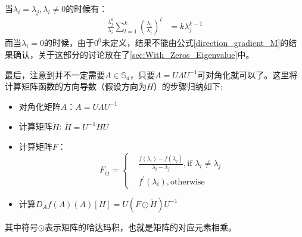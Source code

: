 当$\lambda_{i}=\lambda_{j},\lambda_{i} \neq 0$的时候有：
\begin{equation}
\label{Compute_Zij_2}
\begin{split}
\frac{\lambda_{j}^{k}}{\lambda_{i}}\sum_{l=1}^{k}\left(\frac{\lambda_i}{\lambda_j}\right)^{l}&=k\lambda_{j}^{k-1}
\end{split}
\end{equation}
而当$\lambda_{i}=0$的时候，由于$0^{0}$未定义，结果不能由公式\ref{direction_gradient_M}的结果确认，关于这部分的讨论放在了\ref{sec:With_Zeros_Eigenvalue}中。

最后，注意到并不一定需要$A\in \mathbb{S}_{d}$，只要$A=U\Lambda U^{-1}$可对角化就可以了。这里将计算矩阵函数的方向导数（假设方向为$H$）的步骤归纳如下:
\begin{itemize}
\label{Compute_direct}
\item 对角化矩阵$A$：$A=U\Lambda U^{-1}$
\item 计算矩阵$\tilde{H}$: $\tilde{H}=U^{-1}HU$
\item 计算矩阵$F$：
\begin{equation}
\label{Compute_F}
F_{ij}=\left\{
\begin{split}
&\frac{f(\lambda_i)-f(\lambda_j)}{\lambda_i-\lambda_j},\text{if $\lambda_i \neq \lambda_j$}\\
&f^{\prime}(\lambda_{i}),\text{otherwise}
\end{split}
\right.
\end{equation}
\item 计算$D_{A}f(A)(A)[H]=U(F\odot\tilde{H})U^{-1}$
\end{itemize}
其中符号$\odot$表示矩阵的哈达玛积，也就是矩阵的对应元素相乘。
